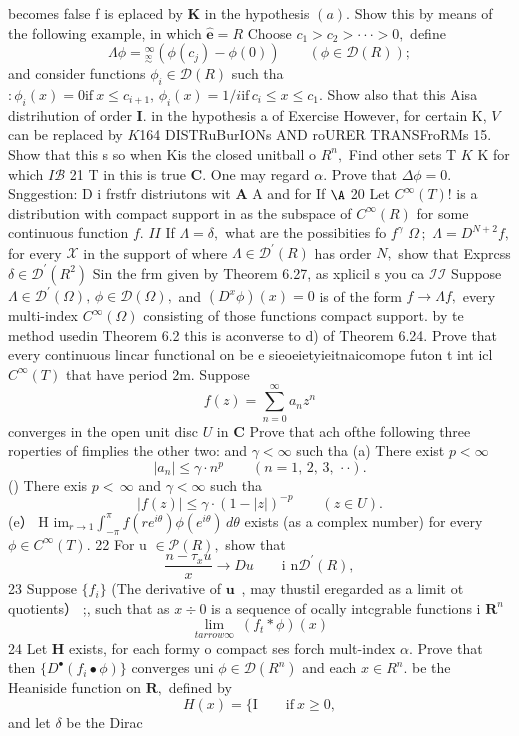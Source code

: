 becomes false f is eplaced by $\boldsymbol{K}$ in the hypothesis $(a).$ Show this by means of the following example, in which $\scriptstyle\mathbf{\hat{e}}=R$ Choose $c_{1}>c_{2}>\cdot\cdot\cdot>0,$ define $$ \Lambda\phi={}_{\stackrel{\infty}{\sim}}^{\infty}(\phi(c_{j})-\phi(0))\qquad(\phi\in{\mathcal{D}}(R)); $$ and consider functions $\phi_{i}\in{\mathcal{D}}(R)$ such tha $:\phi_{i}(x)=0\mathrm{if}\ x\leq c_{i+1},\,\phi_{i}(x)=1/i\mathrm{if}\,c_{i}\leq x\leq c_{1}.$ Show also that this Aisa distrihution of order $\mathbf{I}.$ in the hypothesis a of Exercise However, for certain K, ${\mathbf{}}V$ can be replaced by $K$164 DISTRuBurIONs AND roURER TRANSFroRMs 15. Show that this s so when Kis the closed unitball o $\textstyle R^{n}\!,$ Find other sets T $\textstyle K$ K for which $I{\mathcal{B}}$ 21 T in this is true ${\boldsymbol{C}}.$ One may regard $\alpha.$ Prove that $\Delta\phi=0.$ Snggestion: D i frstfr distriutons wit $\mathbf{A}$ A and for If $\mathrm{\A}$ 20 Let $C^{\infty}(T)!$ is a distribution with compact support in as the subspace of $C^{\infty}(R)$ for some continuous function $f.$ ${\mathit{I}}{\mathit{I}}$ If $\Lambda=\delta,$ what are the possibities fo $f^{\gamma}$ $\Omega\,;$ $\Lambda=D^{N+2}f,$ for every $\scriptstyle{\mathcal{X}}$ in the support of where $\Lambda\in{\mathcal{D}}^{\prime}(R)$ has order $N,$ show that Exprcss $\delta\in{\mathcal{D}}^{\prime}(R^{2})$ Sin the frm given by Theorem 6.27, as xplicil s you ca ${\mathcal{I}}{\mathcal{I}}$ Suppose $\Lambda\in{\mathcal{D}}^{\prime}(\Omega),\,\phi\in{\mathcal{D}}(\Omega),$ and $(D^{x}\phi)(x)=0$ is of the form $f\to\Lambda f,$ every multi-index $C^{\infty}(\Omega)$ consisting of those functions compact support. by te method usedin Theorem 6.2 this is aconverse to d) of Theorem 6.24. Prove that every continuous lincar functional on be e sieoeietyieitnaicomope futon t int icl $C^{\infty}(T)$ that have period 2m. Suppose $$ f(z)=\sum_{n=0}^{\infty}a_{n}z^{n} $$ converges in the open unit disc $U$ in ${\boldsymbol{C}}$ Prove that ach ofthe following three roperties of fimplies the other two: and $\gamma<\infty$ such tha (a) There exist $p<\infty$ $$ \vert a_{n}\vert\leq\gamma\cdot n^{p}\qquad(n=1,\,2,\,3,\,\cdot\cdot). $$ () There exis $p<\,\infty$ and $\gamma<\infty$ such tha $$ |f(z)|\leq\gamma\cdot(1-|z|)^{-p}\qquad(z\in U). $$ (e） H $\mathrm{im}_{r\to1}\int_{-\pi}^{\pi}f(r e^{i\theta})\phi(e^{i\theta})\,d\theta$ exists (as a complex number) for every $\phi\in C^{\infty}(T).$ 22 For u $\in{\mathcal{P}}(R),$ show that $$ {\frac{n-\tau_{x}u}{x}}\to D u\qquad\textrm{i n}{\mathcal{D}}^{\prime}(R), $$ 23 Suppose $\{f_{i}\}$ (The derivative of ${\boldsymbol{u}}\,$ , may thustil eregarded as a limit ot quotients） ;, such that as $x\div0$ is a sequence of ocally intcgrable functions i ${\boldsymbol{R}}^{n}$ $$ \operatorname*{lim}_{t arrow\infty}\ \left({f_{t}}*\phi\right)\!(x) $$ 24 Let ${\boldsymbol{H}}$ exists, for each formy o compact ses forch mult-index $\textstyle\alpha.$ Prove that then $\{D^{\bullet}(f_{i}\bullet\phi)\}$ converges uni $\phi\in{\mathcal{D}}(R^{n})$ and each $x\in R^{n}.$ be the Heaniside function on ${\boldsymbol{R}},$ defined by $$ H(x)= \{\mathrm{I}\qquad\mathrm{if}\ x\geqslant0, $$ and let $\delta$ be the Dirac 